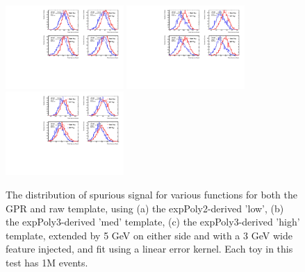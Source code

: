 \begin{figure} 
\begin{center}
  \includegraphics[width=0.4\textwidth]{figures/background/gpr/validation/linear/ToyTest_FitSigVals_lowpT_1M_Sig}   
  \includegraphics[width=0.4\textwidth]{figures/background/gpr/validation/linear/ToyTest_FitSigVals_medpT_1M_Sig}   
  \includegraphics[width=0.4\textwidth]{figures/background/gpr/validation/linear/ToyTest_FitSigVals_highpT_1M_Sig}   
\caption{The distribution of spurious signal for various functions for both the GPR and raw template, using (a) the expPoly2-derived 'low', (b) the expPoly3-derived 'med' template, (c) the expPoly3-derived 'high' template, extended by 5 GeV on either side and with a 3 GeV wide feature injected, and fit using a linear error kernel. Each toy in this test has 1M events.}
\label{fig:linearkernel_lowpt_1M_Sig}
\end{center}
\end{figure}

